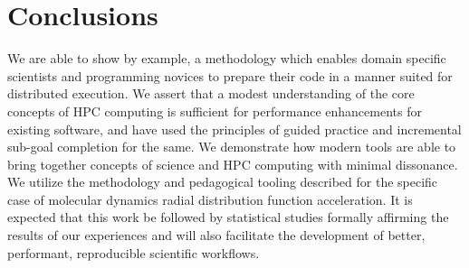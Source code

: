 \documentclass[conference]{IEEEtran}
\begin{document}
\section{Conclusions}
We are able to show by example, a methodology which enables domain specific scientists and programming novices to prepare their code in a manner suited for distributed execution. We assert that a modest understanding of the core concepts of HPC computing is sufficient for performance enhancements for existing software, and have used the principles of guided practice and incremental sub-goal completion for the same. We demonstrate how modern tools are able to bring together concepts of science and HPC computing with minimal dissonance. We utilize the methodology and pedagogical tooling described for the specific case of molecular dynamics radial distribution function acceleration. It is expected that this work be followed by statistical studies formally affirming the results of our experiences and will also facilitate the development of better, performant, reproducible scientific workflows.
\printbibliography
\end{document}
